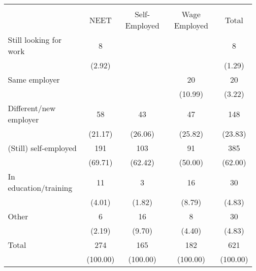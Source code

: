 \begin{tabular}{l*{4}{c}}
\toprule
            &\multicolumn{4}{c}{}                               \\
            &        NEET&Self-Employed&Wage Employed&       Total\\
\hline
Still looking for work&           8&          &       &           8\\
            &      (2.92)&      &      &      (1.29)\\
Same employer&          &          &          20&          20\\
            &      &      &     (10.99)&      (3.22)\\
Different/new employer&          58&          43&          47&         148\\
            &     (21.17)&     (26.06)&     (25.82)&     (23.83)\\
(Still) self-employed&         191&         103&          91&         385\\
            &     (69.71)&     (62.42)&     (50.00)&     (62.00)\\
In education/training&          11&           3&          16&          30\\
            &      (4.01)&      (1.82)&      (8.79)&      (4.83)\\
Other       &           6&          16&           8&          30\\
            &      (2.19)&      (9.70)&      (4.40)&      (4.83)\\
Total       &         274&         165&         182&         621\\
            &    (100.00)&    (100.00)&    (100.00)&    (100.00)\\
\bottomrule
\end{tabular}
